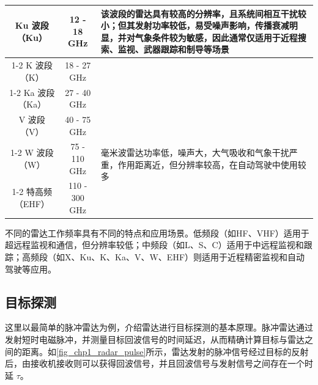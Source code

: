 \begin{table}[htb!]
\begin{tabular}{c|c|p{7cm}}
        Ku 波段（Ku） & 12 - 18 GHz    & \multirow{3}{7cm}{该波段的雷达具有较高的分辨率，且系统间相互干扰较小；但其发射功率较低，易受噪声影响，传播衰减明显，并对气象条件较为敏感，因此通常仅适用于近程搜索、监视、武器跟踪和制导等场景}     \\
        \cline{1-2}
        K 波段（K）   & 18 - 27 GHz    &                                                                                                               \\
        \cline{1-2}
        Ka 波段（Ka） & 27 - 40 GHz    &                                                                                                               \\
        \hline
        V 波段（V）   & 40 - 75 GHz    & \multirow{3}{7cm}{毫米波雷达功率低，噪声大，大气吸收和气象干扰严重，作用距离近，但分辨率较高，在自动驾驶中使用较多}                                           \\
        \cline{1-2}
        W 波段（W）   & 75 - 110 GHz   &                                                                                                               \\
        \cline{1-2}
        特高频（EHF）  & 110 - 300 GHz  &                                                                                                               \\
        \hline
    \end{tabular}
\end{table}
不同的雷达工作频率具有不同的特点和应用场景。低频段（如HF、VHF）适用于超远程监视和通信，但分辨率较低；中频段（如L、S、C）适用于中远程监视和跟踪；高频段（如X、Ku、K、Ka、V、W、EHF）则适用于近程精密监视和自动驾驶等应用。



\subsection{目标探测}
这里以最简单的脉冲雷达为例，介绍雷达进行目标探测的基本原理。脉冲雷达通过发射短时电磁脉冲，并测量目标回波信号的时间延迟，从而精确计算目标与雷达之间的距离。如\cref{fig_chp1_radar_pulse}所示，雷达发射的脉冲信号经过目标的反射后，由接收机接收则可以获得回波信号，并且回波信号与发射信号之间存在一个时延 $\tau$。

